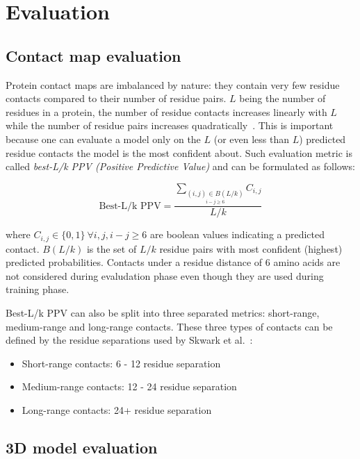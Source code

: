 \section{Evaluation}

  \subsection{Contact map evaluation}

    Protein contact maps are imbalanced by nature: they contain very few residue contacts compared to their number of residue pairs.
    $L$ being the number of residues in a protein, the number of residue contacts increases linearly with $L$ while the number of residue pairs
    increases quadratically~\cite{OLMEA1997S25}. This is important because one can evaluate a model only on the $L$ (or even less than $L$) predicted
    residue contacts the model is the most confident about. Such evaluation metric is called \textit{best-L/k PPV (Positive Predictive Value)}
    and can be formulated as follows:

    \begin{equation}
      \text{Best-L/k PPV} = \frac{\sum_{\underset {i-j \geq 6}{(i, j) \in B(L/k)}} C_{i, j}}{L/k}
    \end{equation}

    where $C_{i, j} \in \{0, 1\} \ \forall i, j, i-j \ge 6$ are boolean values indicating a predicted contact.
    $B(L/k)$ is the set of $L/k$ residue pairs with most confident (highest) predicted probabilities.
    Contacts under a residue distance of 6 amino acids are not considered during evaludation phase even though they are used during
    training phase.

    Best-L/k PPV can also be split into three separated metrics: short-range, medium-range and long-range contacts.
    These three types of contacts can be defined by the residue separations used by Skwark et al.~\cite{10.1371/journal.pcbi.1003889}:

      \begin{itemize}
        \item Short-range contacts: 6 - 12 residue separation
        \item Medium-range contacts: 12 - 24 residue separation
        \item Long-range contacts: 24+ residue separation
      \end{itemize}

    \subsection{3D model evaluation}

